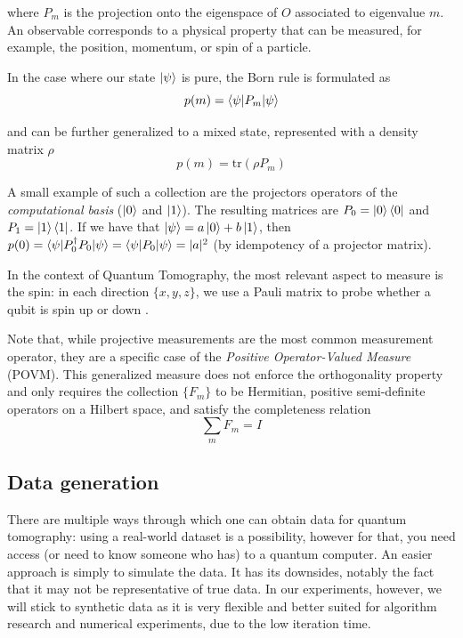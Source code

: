 \documentclass[12pt]{memoir}
\newcommand{\tr}{\text{tr}}
\begin{document}
where $P_m$ is the projection onto the eigenspace of $O$ associated to eigenvalue $m$. An observable corresponds to a physical property that can be measured, for example, the position, momentum, or spin of a particle.\medbreak


In the case where our state $\ket \psi$ is pure, the Born rule is formulated as
\begin{equation}
    p(m) = \braket{\psi|P_m|\psi}
\end{equation}

and can be further generalized to a mixed state, represented with a density matrix $\rho$
\begin{equation}\label{eq:quantum-measurement}
    p(m) = \tr(\rho P_m)
\end{equation}


A small example of such a collection are the projectors operators of the \textit{computational basis} ($\ket 0$ and $\ket 1$). The resulting matrices are $P_0 = \ket 0 \bra 0$ and $P_1 = \ket 1 \bra 1$. If we have that $\ket \psi = a \ket 0 + b \ket 1$, then $p(0) = \braket{\psi|P_0^\dagger P_0|\psi} = \braket{\psi|P_0|\psi} = |a|^2$ (by idempotency of a projector matrix).\medbreak

   

In the context of Quantum Tomography, the most relevant aspect to measure is the spin: in each direction $\{x,y,z\}$, we use a Pauli matrix to probe whether a qubit is spin up or down \cite{book:Nielsen-Chuang-2010,wiki:born-rule}. \medbreak


Note that, while projective measurements are the most common measurement operator, they are a specific case of the \textit{Positive Operator-Valued Measure} (POVM). This generalized measure does not enforce the orthogonality property and only requires the collection $\{F_m\}$ to be Hermitian, positive semi-definite operators on a Hilbert space, and satisfy the completeness relation
\begin{equation}
    \sum_m F_m = I
\end{equation}



\subsection{Data generation}

There are multiple ways through which one can obtain data for quantum tomography: using a real-world dataset is a possibility, however for that, you need access (or need to know someone who has) to a quantum computer. An easier approach is simply to simulate the data. It has its downsides, notably the fact that it may not be representative of true data. In our experiments, however, we will stick to synthetic data as it is very flexible and better suited for algorithm research and numerical experiments, due to the low iteration time.\medbreak
\end{document}
